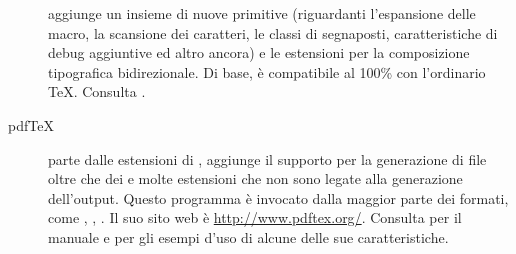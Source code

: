 \documentclass{article}
\begin{document}
\begin{description}

\item [\eTeX] aggiunge un insieme di nuove primitive \label{text:etex}
(riguardanti l'espansione delle macro, la scansione dei caratteri, le
classi di segnaposti, caratteristiche di debug aggiuntive ed altro ancora)
e le estensioni \TeXXeT{} per la composizione tipografica bidirezionale.
Di base, \eTeX{} è compatibile al 100\% con l'ordinario \TeX. Consulta
.

\item [pdf\TeX] parte dalle estensioni di \eTeX, aggiunge il supporto per
la generazione di file  oltre che dei \dvi{} e molte estensioni
che non sono legate alla generazione dell'output. Questo programma è
invocato dalla maggior parte dei formati, come , ,
. Il suo sito web è \url{http://www.pdftex.org/}. Consulta
 per il manuale e
 per gli
esempi d'uso di alcune delle sue caratteristiche.


\end{description}
\end{document}
